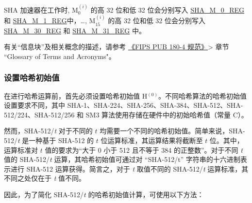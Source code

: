 \documentclass[main\_\_CN.tex]{subfiles}
\begin{document}
\begin{itemize}
    SHA 加速器在工作时, M$^{(i)}_{0}$ 的高 32 位和低 32 位会分别写入 \hyperref[regdesc:SHAMNREG]{SHA\_M\_0\_REG} 和 \hyperref[regdesc:SHAMNREG]{SHA\_M\_1\_REG}中，\dots, M$^{(i)}_{15}$ 的高 32 位和低 32 位会分别写入 \hyperref[regdesc:SHAMNREG]{SHA\_M\_30\_REG} 和 \hyperref[regdesc:SHAMNREG]{SHA\_M\_31\_REG} 中。
        
\end{itemize}

\begin{tiplisting}
有关“信息块”及相关概念的描述，请参考 \href{https://doi.org/10.6028/NIST.FIPS.180-4}{《FIPS PUB 180-4 规范》}> 章节 ``Glossary of Terms and Acronyms"。
\end{tiplisting}


\subsubsection{设置哈希初始值}\label{sec:sha-initial-hash}

在进行哈希运算前，首先必须设置哈希初始值 H$^{(0)}$。不同哈希算法的哈希初始值设置要求不同，其中 SHA-1、SHA-224、SHA-256、SHA-384、SHA-512、SHA-512/224、SHA-512/256 和 SM3 算法使用存储在硬件中的初始哈希值（常量 C）。

然而，SHA-512/{\it{t}} 对于不同的 \begin{math}t\end{math} 均需要一个不同的哈希初始值。简单来说，SHA-512/{\it{t}} 是一种基于 SHA-512 的 \begin{math}t\end{math} 位运算标准，其运算结果将截断至 \begin{math}t\end{math} 位。其中，运算标准对 \begin{math}t\end{math} 值的要求为“大于 0 小于 512 且不等于 384 的正整数”。对于不同 {\it{t}} 值的 SHA-512/{\it{t}} 运算，其哈希初始值可通过对 ``SHA-512/t” 字符串的十六进制表示进行 SHA-512 运算获得。简言之，对于 {\it{t}} 取值不同的 SHA-512/{\it{t}} 运算标准，其不同之处仅在于 {\it{t}} 值不同。

因此，为了简化 SHA-512/{\it{t}} 的哈希初始值计算，可使用以下方法：
\end{document}
